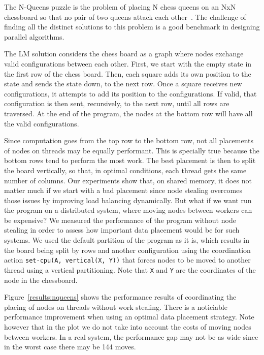The N-Queens puzzle is the problem of placing N chess queens on an NxN
chessboard so that no pair of two queens attack each
other~\cite{8queens}. The challenge of finding all the
distinct solutions to this problem is a good benchmark in designing
parallel algorithms.

The LM solution considers the chess board as a graph where nodes exchange valid
configurations between each other. First, we start with the empty
state in the first row of the chess board. Then, each square adds its own
position to the state and sends the state down, to the next row. Once a square
receives new configurations, it attempts to add its position to the
configurations. If valid, that configuration is then sent, recursively, to the
next row, until all rows are traversed. At the end of the program, the nodes at
the bottom row will have all the valid configurations.

Since computation goes from the top row to the bottom row, not all placements of
nodes on threads may be equally performant. This is specially true because the
bottom rows tend to perform the most work. The best placement is then to split the
board vertically, so that, in optimal conditions, each thread gets the same
number of columns.  Our experiments show that, on shared memory, it does not
matter much if we start with a bad placement since node stealing overcomes those
issues by improving load balancing dynamically. But what if we want run the
program on a distributed system, where moving nodes between workers can be
expensive? We measured the performance of the program without node stealing in
order to assess how important data placement would be for such systems.
We used the default partition of the program as it is, which results in the board being
split by rows and another configuration using the coordination action
\texttt{set-cpu(A, vertical(X, Y))} that forces nodes to be moved to another
thread using a vertical partitioning. Note that \texttt{X} and \texttt{Y} are
the coordinates of the node in the chessboard.

Figure~\ref{results:nqueens} shows the performance results of coordinating the
placing of nodes on threads without work stealing. There is a noticiable
performance improvement when using an optimal data placement strategy. Note
however that in the plot we do not take into account the costs of moving
nodes between workers. In a real system, the performance gap may not be as wide
since in the worst case there may be 144 moves.

